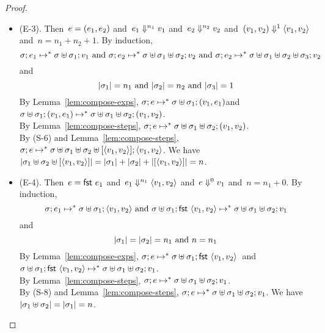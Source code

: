 \documentclass{article}
\begin{document}
\begin{proof}
\begin{itemize}
\item (E-3).
    Then~$e = \kwpair{e_1}{e_2}$
    and~$\eval[n_1]{e_1}{v_1}$
    and~$\eval[n_2]{e_2}{v_2}$
    and~$\eval[1]{\kwpair{v_1}{v_2}}{\kwvpair{v_1}{v_2}}$
    and~$n = n_1 + n_2 + 1$.
    By induction,
    \[
    \cfg{\store}{e_1} 
    \step^* \cfg{\stjoin{\store}{\store_1}}{v_1}
        \text{~and~}
    \cfg{\store}{e_2}
    \step^* \cfg{\stjoin{\stjoin{\store}{\store_1}}{\store_2}}{v_2}
        \text{~and~}
    \cfg{\store}{e_2} 
    \step^* \cfg{\stjoin{\stjoin{\stjoin{\store}{\store_1}}{\store_2}}{\store_3}}{v_2}
    \]
    and
    \[|\store_1| = n_1\text{~and~}|\store_2| = n_2\text{~and~}|\store_3| = 1\]
    By Lemma~\ref{lem:compose-exps},
    $
        \cfg{\store}{e} 
        \step^* \cfg{\stjoin{\store}{\store_1}}{\kwpair{v_1}{e_1}}
    $and~$
        \cfg{\stjoin{\store}{\store_1}}{\kwpair{v_1}{e_1}}
        \step^* \cfg{\stjoin{\stjoin{\store}{\store_1}}{\store_2}}{\kwpair{v_1}{v_2}}
    $.\\
    By Lemma~\ref{lem:compose-steps},
      $\cfg{\store}{e} 
        \step^*
         \cfg{\stjoin{\stjoin{\store}{\store_1}}{\store_2}}{\kwpair{v_1}{v_2}}$.\\
    By (S-6) and Lemma~\ref{lem:compose-steps},
      $\cfg{\store}{e} \step^*
      \cfg{\stjoin{\stjoin{\stjoin{\store}{\store_1}}{\store_2}}{\stsing{\kwvpair{v_1}{v_2}}}}
          {\kwvpair{v_1}{v_2}}$.
          We have
      $|\stjoin{\store_1}{\stjoin{\store_2}{\stsing{\kwvpair{v_1}{v_2}}}}| =
      |\store_1| + |\store_2| + |\stsing{\kwvpair{v_1}{v_2}}| = n$.

\item (E-4).
    Then~$e = \kwfst{e_1}$
    and~$\eval[n_1]{e_1}{\kwvpair{v_1}{v_2}}$
    and~$\eval[0]{e}{v_1}$
    and~$n = n_1 + 0$.
    By induction,
    \[
    \cfg{\store}{e_1} \step^* \cfg{\stjoin{\store}{\store_1}}{\kwvpair{v_1}{v_2}}
    \text{~and~}
    \cfg{\stjoin{\store}{\store_1}}{\kwfst{\kwvpair{v_1}{v_2}}} 
        \step^* 
        \cfg{\stjoin{\stjoin{\store}{\store_1}}{\store_2}}{v_1}
    \]
    and
    \[|\store_1| = |\store_2| = n_1 \text{~and~} n = n_1 \]
    By Lemma~\ref{lem:compose-exps},
    $
        \cfg{\store}{e} \step^* \cfg{\stjoin{\store}{\store_1}}{\kwfst{\kwvpair{v_1}{v_2}}}
    $~and~$
        \cfg{\stjoin{\store}{\store_1}}{\kwfst{\kwvpair{v_1}{v_2}}} 
        \step^* 
        \cfg{\stjoin{\stjoin{\store}{\store_1}}{\store_2}}{v_1}
    $.\\
    By Lemma~\ref{lem:compose-steps},
      $\cfg{\store}{e} \step^*
        \cfg{\stjoin{\stjoin{\store}{\store_1}}{\store_2}}{v_1}$.\\
    By (S-8) and Lemma~\ref{lem:compose-steps},
      $\cfg{\store}{e} \step^*
      \cfg{\stjoin{\stjoin{\store}{\store_1}}{\store_2}}{v_1}$.
          We have
      $|\stjoin{\store_1}{\store_2}| =
      |\store_1| = n$.


\end{itemize}
\end{proof}
\end{document}
